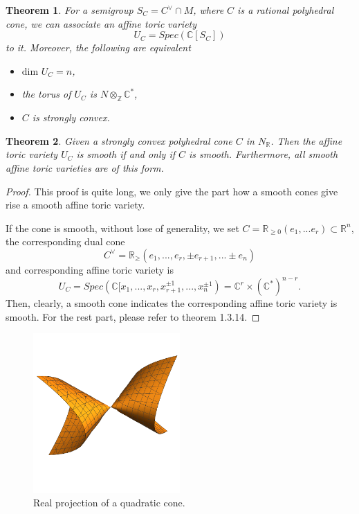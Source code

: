 \documentclass[11pt]{article}
\newtheorem{thm}{Theorem}[section]
\newcommand{\reals}{\mathbb R}
\begin{document}
\begin{thm}
	For a semigroup $S_{C}=C^\vee \cap M$, where $C$ is a rational polyhedral cone, we can associate an affine toric variety
	\begin{equation*}
		U_{C}=Spec(\mathbb{C}[S_{C}])
	\end{equation*}
	to it. Moreover, the following are equivalent
	\begin{itemize}
		\item $\text{dim } U_C=n$,
		\item the torus of $U_C$ is $N\otimes_{\mathbb{Z}}\mathbb{C}^*$,
		\item $C$ is strongly convex.
	\end{itemize}
\end{thm}

\begin{thm}\label{smooth_affine}
	Given a strongly convex polyhedral cone $C$ in $N_{\reals}$. Then the affine toric variety $U_C$ is smooth if and only if $C$ is smooth. Furthermore, all smooth affine toric varieties are of this form.
\end{thm}
\begin{proof}
This proof is quite long, we only give the part how a smooth cones give rise a smooth affine toric variety. 

If the cone is smooth, without lose of generality, we set $C=\mathbb{R}_{\geq 0}(e_1,...e_r)\subset \mathbb{R}^n$, the corresponding dual cone
\begin{equation*}
	C^\vee =\mathbb{R}_{\geq}(e_1,...,e_r,\pm e_{r+1},...\pm e_{n})
\end{equation*}
and corresponding affine toric variety is 
\begin{equation*}
	U_{C}=Spec(\mathbb{C}[x_1,...,x_r,x_{r+1}^{\pm 1},...,x_{n}^{\pm 1})=\mathbb{C}^r\times(\mathbb{C}^*)^{n-r}.
\end{equation*}
Then, clearly, a smooth cone indicates the corresponding affine toric variety is smooth. For the rest part, please refer to \cite{cox2009toric}theorem 1.3.14.
\end{proof}

\begin{figure}[htbp!]
	\centering
	\includegraphics[width = 0.5\textwidth]{cones}
	\caption{Real projection of a quadratic cone.}\label{fig:cone}
\end{figure}
\end{document}
